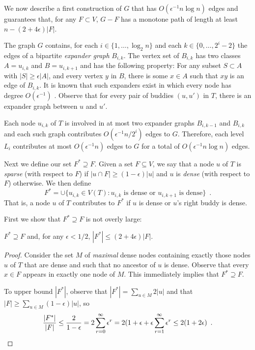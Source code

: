 \documentclass{patmorin}
\begin{document}
We now describe a first construction of $G$ that has $O(\epsilon^{-1}n\log
n)$ edges and guarantees that, for any $F\subset V$,  $G-F$ has a monotone
path of length at least $n-(2+4\epsilon)|F|$.

The graph $G$ contains, for each $i\in\{1,\ldots,\log_2 n\}$ and each
$k\in\{0,\ldots,2^{i}-2\}$ the edges of a bipartite \emph{expander graph}
$B_{i,k}$.  The vertex set of $B_{i,k}$ has two classes $A=u_{i,k}$ and
$B=u_{i,k+1}$ and has the following property:  For any subset $S\subset
A$ with $|S|\ge \epsilon |A|$, and every vertex $y$ in $B$, there is
some $x\in A$ such that $xy$ is an edge of $B_{i,k}$. It is known that
such expanders exist in which every node has degree $O(\epsilon^{-1})$
\cite{X}.  Observe that for every pair of buddies $(u,u')$ in $T$,
there is an expander graph between $u$ and $u'$.

Each node $u_{i,k}$ of $T$ is involved in at most two expander
graphs $B_{i,k-1}$ and $B_{i,k}$ and each such graph contributes
$O(\epsilon^{-1}n/2^{i})$ edges to $G$.  Therefore, each level $L_i$
contributes at most $O(\epsilon^{-1} n)$ edges to $G$ for a total of
$O(\epsilon^{-1}n\log n)$ edges.  

Next we define our set $F^*\supseteq F$.  Given a set $F\subseteq V$,
we say that a node $u$ of $T$ is \emph{sparse} (with respect to $F$)
if $|u\cap F| \ge (1-\epsilon)|u|$ and $u$ is \emph{dense} (with respect
to $F$) otherwise.  We then define
\[
	F^* = \cup\{ u_{i,k}\in V(T): \text{$u_{i,k}$ is dense or $u_{i,k+1}$ is dense} \} \enspace .
\]
That is, a node $u$ of $T$ contributes to $F^*$ if $u$ is dense or $u$'s
right buddy is dense.

First we show that $F^*\supseteq F$ is not overly large:

\begin{clm}
  $F^*\supseteq F$ and, for any $\epsilon < 1/2$, $|F^*|\le (2+4\epsilon)|F|$.
\end{clm}

\begin{proof}
  Consider the set $M$ of \emph{maximal} dense nodes containing exactly
  those nodes $u$ of $T$ that are dense and such that no ancestor of $u$
  is dense.  Observe that every $x\in F$ appears in exactly one node
  of $M$.  This immediately implies that $F^*\supseteq F$.

  To upper bound $|F^*|$, observe that $|F^*| = \sum_{u\in M} 2|u|$
  and that 
	$|F| \ge \sum_{u\in M} (1-\epsilon)|u|$, 
	so
  \[
    \frac{|F^*|}{|F|} 
      \le \frac{2}{1-\epsilon} 
	= 2\sum_{r=0}^\infty\epsilon^r 
	= 2(1+\epsilon + \epsilon\sum_{r=1}^\infty \epsilon^r 
	\le 2(1+2\epsilon) \enspace . \qedhere
	  \]
\end{proof}
\end{document}
